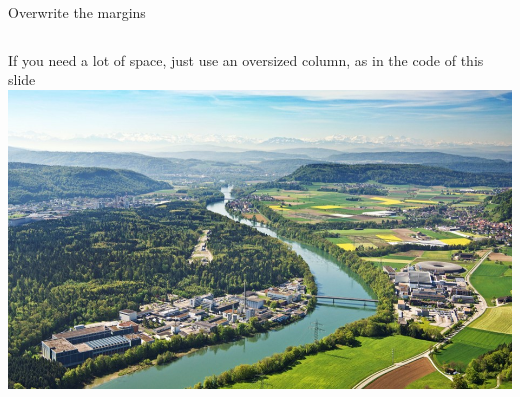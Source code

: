 \documentclass[aspectratio=169]{beamer}
\begin{document}
\begin{frame}{Overwrite the margins}
\begin{columns}
  \begin{column}{1.2\linewidth}
     If you need a lot of space, just use an oversized column, as in the code of this slide
     \includegraphics[width=\linewidth]{PSIlandscape43}
  \end{column}
\end{columns}
\end{frame}

  
\end{document}
